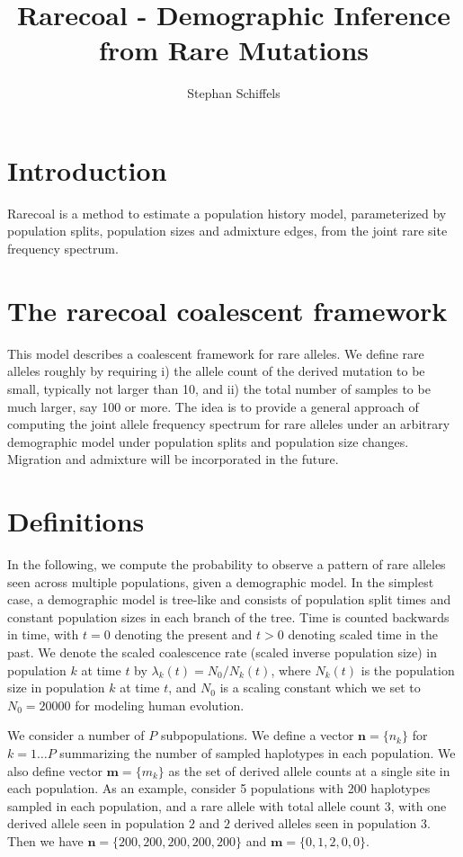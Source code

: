 \documentclass[a4paper]{article}
\begin{document}
\title{Rarecoal - Demographic Inference from Rare Mutations}
\author{Stephan Schiffels}
\date{}
\maketitle

\section{Introduction}
Rarecoal is a method to estimate a population history model, parameterized by population splits, population sizes and admixture edges, from the joint rare site frequency spectrum.

\section{The rarecoal coalescent framework}
This model describes a coalescent framework for rare alleles. We define rare alleles roughly by requiring i) the allele count of the derived mutation to be small, typically not larger than 10, and ii) the total number of samples to be much larger, say 100 or more. The idea is to provide a general approach of computing the joint allele frequency spectrum for rare alleles under an arbitrary demographic model under population splits and population size changes. Migration and admixture will be incorporated in the future.


\section{Definitions}
In the following, we compute the probability to observe a pattern of rare alleles seen across multiple populations, given a demographic model. In the simplest case, a demographic model is tree-like and consists of population split times and constant population sizes in each branch of the tree. Time is counted backwards in time, with $t=0$ denoting the present and $t>0$ denoting scaled time in the past. We denote the scaled coalescence rate (scaled inverse population size) in population $k$ at time $t$ by $\lambda_k(t)=N_0/N_k(t)$, where $N_k(t)$ is the population size in population $k$ at time $t$, and $N_0$ is a scaling constant which we set to $N_0=20000$ for modeling human evolution.

We consider a number of $P$ subpopulations. We define a vector $\mathbf{n}=\{n_k\}$ for $k=1\ldots P$ summarizing the number of sampled haplotypes in each population. We also define vector $\mathbf{m}=\{m_k\}$ as the set of derived allele counts at a single site in each population. As an example, consider 5 populations with 200 haplotypes sampled in each population, and a rare allele with total allele count $3$, with one derived allele seen in population $2$ and $2$ derived alleles seen in population $3$. Then we have $\mathbf{n}=\{200,200,200,200,200\}$ and $\mathbf{m}=\{0,1,2,0,0\}$.
\end{document}
